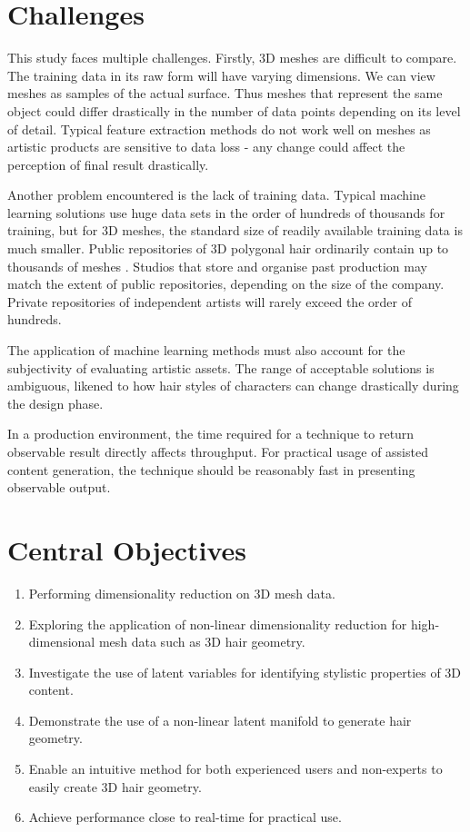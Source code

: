 \documentclass[ %
author={Dillon Keith Diep},
supervisor={Dr. Carl Henrik Ek},
degree={MEng},
title={ART-CG Hair:},
subtitle={Assisted Real-time Content Generation of Stylised Virtual Hair},
type={Research},
year={2017} ]{dissertation}
\begin{document}
\section{Challenges}
This study faces multiple challenges. Firstly, 3D meshes are difficult to compare. The training data in its raw form will have varying dimensions. We can view meshes as samples of the actual surface. Thus meshes that represent the same object could differ drastically in the number of data points depending on its level of detail. Typical feature extraction methods do not work well on meshes as artistic products are sensitive to data loss - any change could affect the perception of final result drastically.

Another problem encountered is the lack of training data. Typical machine learning solutions use huge data sets in the order of hundreds of thousands for training, but for 3D meshes, the standard size of readily available training data is much smaller. Public repositories of 3D polygonal hair ordinarily contain up to thousands of meshes \cite{tsr}. Studios that store and organise past production may match the extent of public repositories, depending on the size of the company. Private repositories of independent artists will rarely exceed the order of hundreds.

The application of machine learning methods must also account for the subjectivity of evaluating artistic assets. The range of acceptable solutions is ambiguous, likened to how hair styles of characters can change drastically during the design phase.

In a production environment, the time required for a technique to return observable result directly affects throughput. For practical usage of assisted content generation, the technique should be reasonably fast in presenting observable output.

\section{Central Objectives}
\label{chap:context:objectives}
\begin{enumerate}
	\item Performing dimensionality reduction on 3D mesh data.
	\item Exploring the application of non-linear dimensionality reduction for high-dimensional mesh data such as 3D hair geometry.
	\item Investigate the use of latent variables for identifying stylistic properties of 3D content.
	\item Demonstrate the use of a non-linear latent manifold to generate hair geometry.
	\item Enable an intuitive method for both experienced users and non-experts to easily create 3D hair geometry.
	\item Achieve performance close to real-time for practical use.
\end{enumerate}
\end{document}
